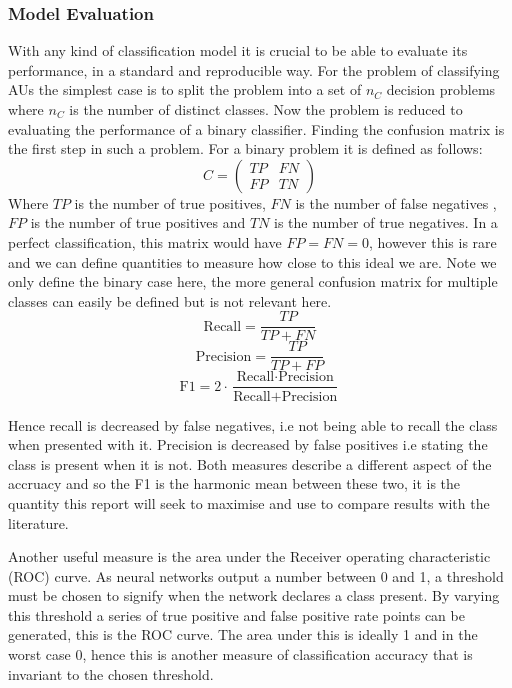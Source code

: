 \documentclass[9pt]{article} \usepackage{amsmath, amsthm, amssymb}
\begin{document}
\subsubsection{Model Evaluation}
With any kind of classification model it is crucial to be able to evaluate its
performance, in a standard and reproducible way. For the problem of classifying
AUs the simplest case is to split the problem into a set of $n_C$ decision problems
where $n_C$ is the number of distinct classes. Now the problem is reduced to
evaluating the performance of a binary classifier. Finding the confusion matrix is
the first step in such a problem. For a binary problem it is defined as follows:
\begin{equation}
C =
\begin{pmatrix}
TP & FN\\
FP & TN
\end{pmatrix}
\end{equation}
Where $TP$ is the number of true positives, $FN$ is the number of false negatives
, $FP$ is the number of true positives and $TN$ is the number of true negatives.
In a perfect classification, this matrix would have $FP=FN=0$, however this is rare
and we can define quantities to measure how close to this ideal we are. Note we
only define the binary case here, the more general confusion matrix for multiple
classes can easily be defined but is not relevant here.
\begin{equation}
\text{Recall} = \frac{TP}{TP+FN}
\end{equation}
\begin{equation}
\text{Precision} = \frac{TP}{TP+FP}
\end{equation}
\begin{equation}
\text{F1} = 2 \cdot \frac{\text{Recall} \cdot \text{Precision}}{\text{Recall} + \text{Precision}}
\end{equation}

Hence recall is decreased by false negatives, i.e not being able to recall the class
when presented with it. Precision is decreased by false positives i.e stating the class
is present when it is not. Both measures describe a different aspect of the accruacy and so the F1 is the
harmonic mean between these two, it is the quantity this report will seek to maximise and use to compare
results with the literature.

Another useful measure is the area under the Receiver operating characteristic (ROC) curve.
As neural networks output a number between 0 and 1, a threshold must be chosen to signify
when the network declares a class present. By varying this threshold a series of true positive and false positive rate points
can be generated, this is the ROC curve. The area under this is ideally 1 and in the worst case 0, hence this is
another measure of classification accuracy that is invariant to the chosen threshold.
\end{document}
